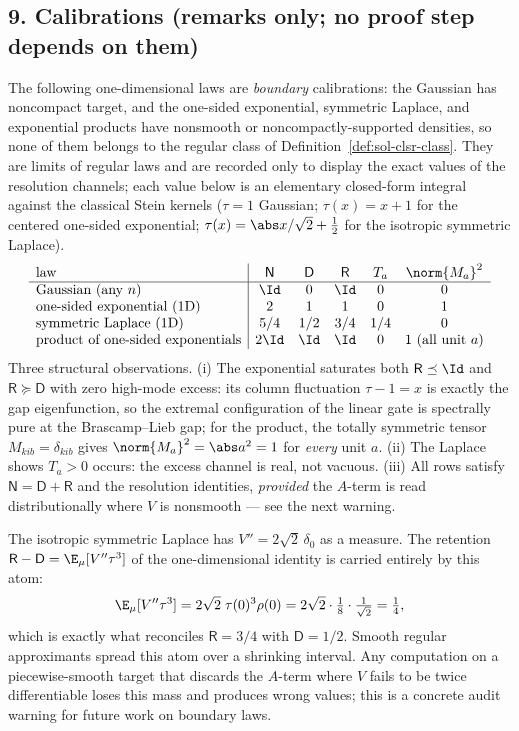 \documentclass[../main.tex]{subfiles}
\begin{document}
\subsection*{9. Calibrations (remarks only; no proof step depends on them)}

\begin{remark}
\label{rem:sol-clsr-calibrations}
The following one-dimensional laws are \emph{boundary} calibrations: the Gaussian has
noncompact target, and the one-sided exponential, symmetric Laplace, and exponential products
have nonsmooth or noncompactly-supported densities, so none of them belongs to the regular
class of Definition~\ref{def:sol-clsr-class}.  They are limits of regular laws and are
recorded only to display the exact values of the resolution channels; each value below is an
elementary closed-form integral against the classical Stein kernels
($\tau=1$ Gaussian; $\tau(x)=x+1$ for the centered one-sided exponential;
$\tau(x)=\abs x/\sqrt2+\tfrac12$ for the isotropic symmetric Laplace).
\[
\begin{array}{l|ccccc}
 \text{law} & \mathsf N & \mathsf D & \mathsf R & T_a & \norm{M_a}^2\\\hline
 \text{Gaussian (any }n) & \Id & 0 & \Id & 0 & 0\\
 \text{one-sided exponential (1D)} & 2 & 1 & 1 & 0 & 1\\
 \text{symmetric Laplace (1D)} & 5/4 & 1/2 & 3/4 & 1/4 & 0\\
 \text{product of one-sided exponentials} & 2\Id & \Id & \Id & 0 & 1\ (\text{all unit }a)
\end{array}
\]
Three structural observations.  (i) The exponential saturates both $\mathsf R\preceq\Id$ and
$\mathsf R\succeq\mathsf D$ with zero high-mode excess: its column fluctuation
$\tau-1=x$ is exactly the gap eigenfunction, so the extremal configuration of the linear gate
is spectrally pure at the Brascamp--Lieb gap; for the product, the totally symmetric tensor
$M_{kib}=\delta_{kib}$ gives $\norm{M_a}^2=\abs a^2=1$ for \emph{every} unit $a$.  (ii) The
Laplace shows $T_a>0$ occurs: the excess channel is real, not vacuous.  (iii) All rows satisfy
$\mathsf N=\mathsf D+\mathsf R$ and the resolution identities, \emph{provided} the $A$-term is
read distributionally where $V$ is nonsmooth --- see the next warning.
\end{remark}

\begin{warning}
\label{warn:sol-clsr-laplace}
The isotropic symmetric Laplace has $V''=2\sqrt2\,\delta_0$ as a measure.  The retention
$\mathsf R-\mathsf D=\E_\mu[V''\tau^3]$ of the one-dimensional identity is carried entirely by
this atom:
\[
  \E_\mu[V''\tau^3]
  =2\sqrt2\;\tau(0)^3\rho(0)
  =2\sqrt2\cdot\tfrac18\cdot\tfrac1{\sqrt2}=\tfrac14,
\]
which is exactly what reconciles $\mathsf R=3/4$ with $\mathsf D=1/2$.  Smooth regular
approximants spread this atom over a shrinking interval.  Any computation on a
piecewise-smooth target that discards the $A$-term where $V$ fails to be twice differentiable
loses this mass and produces wrong values; this is a concrete audit warning for future work on
boundary laws.
\end{warning}
\end{document}
